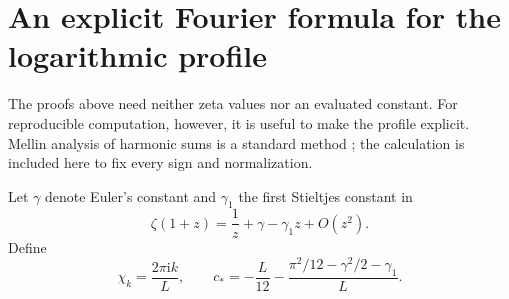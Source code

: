 \documentclass[11pt,a4paper,oneside,openany]{book}
\numberwithin{equation}{chapter}
\theoremstyle{definition}
\theoremstyle{remark}
\newcommand{\ii}{\mathrm i}
\begin{document}
\chapter{An explicit Fourier formula for the logarithmic profile}
\label{dc:sec:log-Fourier}
The proofs above need neither zeta values nor an evaluated constant.
For reproducible computation, however, it is useful to make the
profile explicit. Mellin analysis of harmonic sums is a standard
method \cite{fgd}; the calculation is included here to fix every
sign and normalization.

Let $\gamma$ denote Euler's constant and $\gamma_1$ the first
Stieltjes constant in
\begin{equation}
 \zeta(1+z)=\frac1z+\gamma-\gamma_1z+O(z^2).
 \label{dc:eq:stieltjes-convention}
\end{equation}
Define
\begin{equation}
 \chi_k=\frac{2\pi\ii k}{L},\qquad
 c_*=-\frac L{12}-\frac{\pi^2/12-\gamma^2/2-\gamma_1}{L}.
 \label{dc:eq:cstar}
\end{equation}
\end{document}
